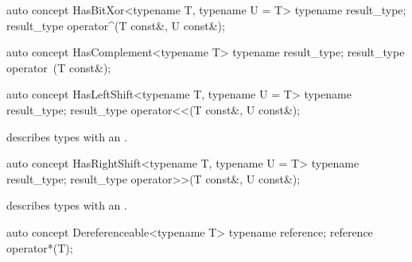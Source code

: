\documentclass[american,twoside]{book}
\begin{document}
\begin{itemdescr}
\pnum
{}
\end{itemdescr}

\begin{itemdecl}
auto concept HasBitXor<typename T, typename U = T> {
  typename result_type;
  result_type operator^(T const&, U const&);
}
\end{itemdecl}

\begin{itemdescr}
\pnum
{}
\end{itemdescr}

\begin{itemdecl}
auto concept HasComplement<typename T> {
  typename result_type;
  result_type operator~(T const&);
}
\end{itemdecl}

\begin{itemdescr}
\pnum
{}
\end{itemdescr}

\begin{itemdecl}
auto concept HasLeftShift<typename T, typename U = T> {
  typename result_type;
  result_type operator<<(T const&, U const&);
}
\end{itemdecl}

\begin{itemdescr}
\pnum
\mbox{\reallynote} describes types with an \mbox{}.
\end{itemdescr}

\begin{itemdecl}
auto concept HasRightShift<typename T, typename U = T> {
  typename result_type;
  result_type operator>>(T const&, U const&);
}
\end{itemdecl}

\begin{itemdescr}
\pnum
\mbox{\reallynote} describes types with an \mbox{}.
\end{itemdescr}

\begin{itemdecl}
auto concept Dereferenceable<typename T> {
  typename reference;
  reference operator*(T);
}
\end{itemdecl}

\begin{itemdescr}
\pnum
{}
\end{itemdescr}
\end{document}
